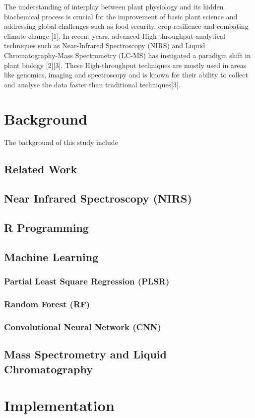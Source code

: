 \documentclass[12pt,a4paper]{report}
\begin{document}
The understanding of interplay between plant physiology and its hidden biochemical process is crucial for the improvement of basic plant science and addressing global challenges such as food security, crop resilience and combating climate change [1]. 
In recent years, advanced High-throughput analytical techniques such as Near-Infrared Spectroscopy (NIRS) and Liquid Chromatography-Mass Spectrometry (LC-MS) has instigated a paradigm shift in plant biology [2][3].
These High-throughput techniques are mostly used in areas like genomics, imaging and spectroscopy and is known for their ability to collect and analyse the data faster than traditional techniques[3].

\chapter{Background}
The background of this study include
\section{Related Work}
\section{Near Infrared Spectroscopy (NIRS)}
\section{R Programming}
\section{Machine Learning}
\subsection{Partial Least Square Regression (PLSR)}
\subsection{Random Forest (RF)}
\subsection{Convolutional Neural Network (CNN)}
\section{Mass Spectrometry and Liquid Chromatography}



\chapter{Implementation}
\end{document}
